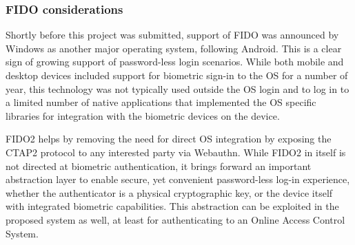 \subsubsection*{FIDO considerations}
Shortly before this project was submitted, support of FIDO was announced by Windows as another major operating system, following Android. This is a clear sign of growing support of password-less login scenarios. While both mobile and desktop devices included support for biometric sign-in to the OS for a number of year, this technology was not typically used outside the OS login and to log in to a limited number of native applications that implemented the OS specific libraries for integration with the biometric devices on the device.

FIDO2 helps by removing the need for direct OS integration by exposing the CTAP2 protocol to any interested party via Webauthn. While FIDO2 in itself is not directed at biometric authentication, it brings forward an important abstraction layer to enable secure, yet convenient password-less log-in experience, whether the authenticator is a physical cryptographic key, or the device itself with integrated biometric capabilities. This abstraction can be exploited in the proposed system as well, at least for authenticating to an Online Access Control System.